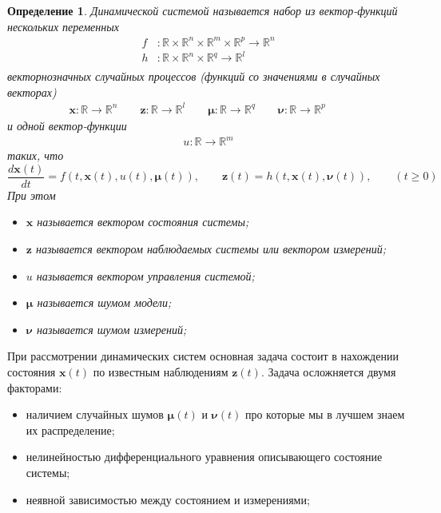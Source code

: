 \documentclass[12pt]{article}
\newtheorem{definition}[theorem]{Определение}
\begin{document}
\begin{definition}
    Динамической системой называется набор из вектор-функций нескольких переменных
    \begin{equation}
        \begin{aligned}
            f & :\mathbb{R}\times\mathbb{R}^n\times \mathbb{R}^m\times \mathbb{R}^p\to\mathbb{R}^n \\
            h & :\mathbb{R}\times\mathbb{R}^n\times\mathbb{R}^q\to\mathbb{R}^l                     \\
        \end{aligned}
    \end{equation}
    векторнозначных случайных процессов (функций со значениями в случайных векторах)
    \begin{equation}
        \begin{aligned}
            \pmb{x}:\mathbb{R}\to\mathbb{R}^n \qquad
            \pmb{z}:\mathbb{R}\to\mathbb{R}^l \qquad
            \pmb{\mu}:\mathbb{R}\to\mathbb{R}^q \qquad
            \pmb{\nu}:\mathbb{R}\to\mathbb{R}^p \qquad
        \end{aligned}
    \end{equation}
    и одной вектор-функции
    \begin{equation}
        \begin{aligned}
            u:\mathbb{R}\to\mathbb{R}^m
        \end{aligned}
    \end{equation}
    таких, что
    \begin{equation}
        \frac{d \pmb{x}(t)}{dt}=f(t, \pmb{x}(t), u(t), \pmb{\mu}(t)), \qquad
        \pmb{z}(t)=h(t, \pmb{x}(t), \pmb{\nu}(t)), \qquad
        (t\geq 0)
    \end{equation}
    При этом
    \begin{itemize}
        \item[] $\pmb{x}$ называется вектором состояния системы;
        \item[] $\pmb{z}$ называется вектором наблюдаемых системы или вектором измерений;
        \item[] $u$ называется вектором управления системой;
        \item[] $\pmb{\mu}$ называется шумом модели;
        \item[] $\pmb{\nu}$ называется шумом измерений;
    \end{itemize}
\end{definition}

При рассмотрении динамических систем основная задача состоит в нахождении
состояния $\pmb{x}(t)$ по известным наблюдениям $\pmb{z}(t)$. Задача осложняется
двумя факторами:
\begin{itemize}
    \item[] наличием случайных шумов $\pmb{\mu}(t)$ и $\pmb{\nu}(t)$ про
          которые мы в лучшем знаем их распределение;
    \item[] нелинейностью дифференциального уравнения описывающего состояние системы;
    \item[] неявной зависимостью между состоянием и измерениями;
\end{itemize}
\end{document}
